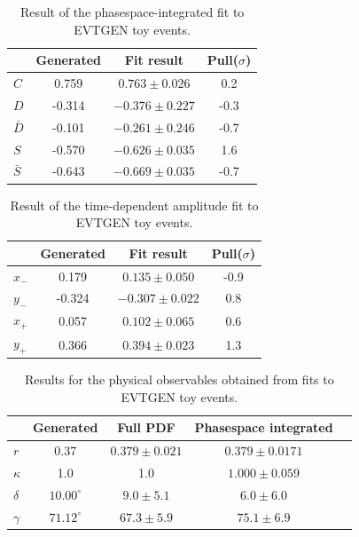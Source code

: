 \begin{table}[h]
\caption{Result of the phasespace-integrated fit to \textsf{EVTGEN} toy events.} 		
  \centering
  \begin{tabular}
    {l c c c}
    \hline \hline
    & Generated &  Fit result  & Pull($\sigma$) \\   \hline
    $C$ & 0.759  &  $0.763 \pm 0.026 $  & 0.2 	 \\
    $D$ &  -0.314 &  $-0.376 \pm 0.227$ & -0.3	 \\
    $\bar D$ &  -0.101 &  $-0.261 \pm 0.246$ & -0.7	 \\
    $S$ &   -0.570 &  $-0.626 \pm 0.035$	& 1.6 \\
    $\bar S$ &  -0.643   &  $-0.669\pm 0.035$ & -0.7	 \\
    \hline \hline
  \end{tabular}
    \label{tab:FitGenMC}
\end{table}

\begin{table}[h]
\caption{Result of the time-dependent amplitude fit to \textsf{EVTGEN} toy events.} 		
  \centering
  \begin{tabular}
    {l c c c}
    \hline \hline
    & Generated &  Fit result & Pull($\sigma$) \\   \hline
    $x_-$ & 0.179  &  $0.135 \pm 0.050$ & -0.9	 \\
    $y_-$ &  -0.324 & $-0.307 \pm 0.022$ 	& 0.8 \\
    $x_+$ &  0.057 & $0.102 \pm 0.065$ & 0.6	 \\
    $y_+$ &   0.366 &  $0.394 \pm 0.023$	& 1.3 \\
    \hline \hline
  \end{tabular}
    \label{tab:FitGenMC2}
\end{table}

\begin{table}[h]
\caption{Results for the physical observables obtained from fits to \textsf{EVTGEN} toy events.} 		
  \centering
  \begin{tabular}
    {l c c c c}
    \hline \hline
    & Generated &  Full PDF     &   Phasespace integrated  \\   \hline
	$r$ & 0.37 & $0.379 \pm 0.021 $ & $0.379 \pm 0.0171$  \\
	$\kappa$  &1.0 & 1.0 &  $1.000 \pm  0.059$  \\
	$\delta$ & $10.00^\circ$ &  $9.0 \pm  5.1$ & $6.0 \pm  6.0$   \\
	$\gamma$ & $71.12^\circ$ &   $67.3 \pm 5.9$ &  $75.1 \pm 6.9$\\
    \hline \hline
  \end{tabular}
      \label{tab:FitGenMC3}
\end{table}


